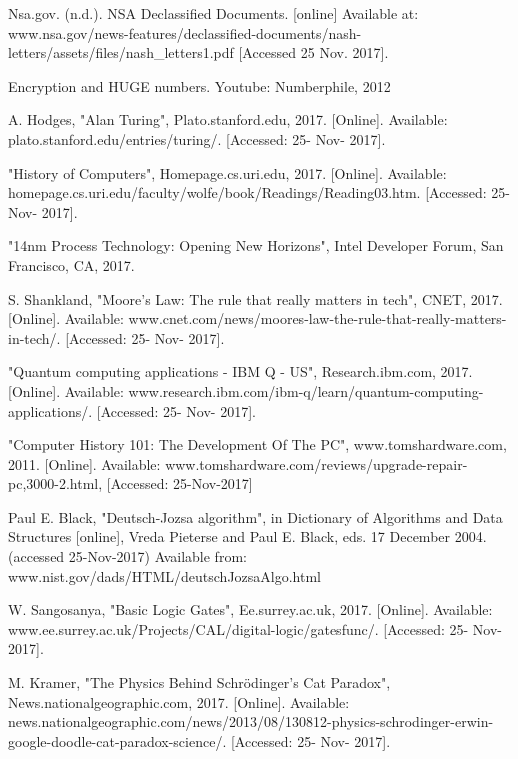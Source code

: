 \documentclass[10pt,journal,compsoc]{IEEEtran}
\begin{document}
\begin{thebibliography}{1}
	
	Nsa.gov. (n.d.). NSA Declassified Documents. [online] Available at: www.nsa.gov/news-features/declassified-documents/nash-letters/assets/files/nash\_letters1.pdf [Accessed 25 Nov. 2017].
	
	Encryption and HUGE numbers. Youtube: Numberphile, 2012
	
	A. Hodges, "Alan Turing", Plato.stanford.edu, 2017. [Online]. Available: plato.stanford.edu/entries/turing/. [Accessed: 25- Nov- 2017].
	
	
	"History of Computers", Homepage.cs.uri.edu, 2017. [Online]. Available: homepage.cs.uri.edu/faculty/wolfe/book/Readings/Reading03.htm. [Accessed: 25- Nov- 2017].
	
	"14nm Process Technology: Opening New Horizons", Intel Developer Forum, San Francisco, CA, 2017.
	
	S. Shankland, "Moore's Law: The rule that really matters in tech", CNET, 2017. [Online]. Available: www.cnet.com/news/moores-law-the-rule-that-really-matters-in-tech/. [Accessed: 25- Nov- 2017].
	
	"Quantum computing applications - IBM Q - US", Research.ibm.com, 2017. [Online]. Available: www.research.ibm.com/ibm-q/learn/quantum-computing-applications/. [Accessed: 25- Nov- 2017].
	
	"Computer History 101: The Development Of The PC", www.tomshardware.com, 2011. [Online]. Available: www.tomshardware.com/reviews/upgrade-repair-pc,3000-2.html, [Accessed: 25-Nov-2017]
	
	Paul E. Black, "Deutsch-Jozsa algorithm", in Dictionary of Algorithms and Data Structures [online], Vreda Pieterse and Paul E. Black, eds. 17 December 2004. (accessed 25-Nov-2017) Available from: www.nist.gov/dads/HTML/deutschJozsaAlgo.html
	
	W. Sangosanya, "Basic Logic Gates", Ee.surrey.ac.uk, 2017. [Online]. Available: www.ee.surrey.ac.uk/Projects/CAL/digital-logic/gatesfunc/. [Accessed: 25- Nov- 2017].
	
	M. Kramer, "The Physics Behind Schrödinger's Cat Paradox", News.nationalgeographic.com, 2017. [Online]. Available: news.nationalgeographic.com/news/2013/08/130812-physics-schrodinger-erwin-google-doodle-cat-paradox-science/. [Accessed: 25- Nov- 2017].
	

\end{thebibliography}
\end{document}
